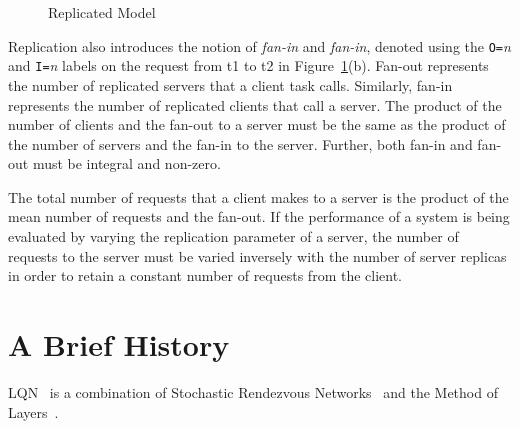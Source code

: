 \begin{figure}[htbp]
  \centering
  \caption{Replicated Model}
  \label{fig:replicated-flat}
\end{figure}

Replication also introduces the notion of
\emph{fan-in} and
\emph{fan-in}, denoted using the
\texttt{O=}\emph{n} and \texttt{I=}\emph{n} labels on the request from
t1 to t2 in Figure~\ref{fig:replicated-flat}(b).  Fan-out represents
the number of replicated servers that a client task calls.  Similarly,
fan-in represents the number of replicated clients that call a server.
The product of the number of clients and the fan-out to a server must
be the same as the product of the number of servers and the fan-in to
the server.  Further, both fan-in and fan-out must be integral and
non-zero.  

The total number of requests that a client makes to a server is the product of the mean number of requests
and the fan-out.  If the performance of a system is being evaluated by varying the replication parameter of
a server, the number of requests to the server must be varied inversely with the number of server replicas
in order to retain a constant number of requests from the client.

\section{A Brief History}
\label{sec:history}

LQN~\cite{perf:franks-2009-ieeese-lqn} is a combination of Stochastic Rendezvous
Networks~\cite{srvn:woodside-94-ieeetc-srvn} and the Method of Layers~\cite{perf:rolia-95-ieeese-mol}.


